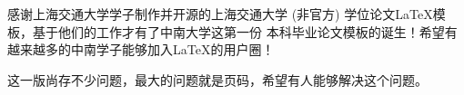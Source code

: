 \begin{thanks}

  感谢上海交通大学学子制作并开源的上海交通大学 (非官方) 学位论文\LaTeX 模板，基于他们的工作才有了中南大学这第一份 {\color{red}{(非官方)}} 本科毕业论文模板\version 的诞生！希望有越来越多的中南学子能够加入\LaTeX 的用户圈！ 
  
  这一版尚存不少问题，最大的问题就是页码，希望有人能够解决这个问题。
\end{thanks}
